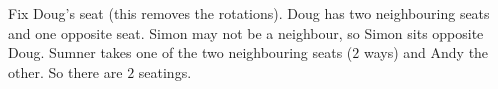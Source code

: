Fix Doug's seat (this removes the rotations). Doug has two neighbouring seats and one opposite seat. Simon may not be a neighbour, so Simon sits opposite Doug. Sumner takes one of the two neighbouring seats ($2$ ways) and Andy the other. So there are $\boxed{2}$ seatings.
